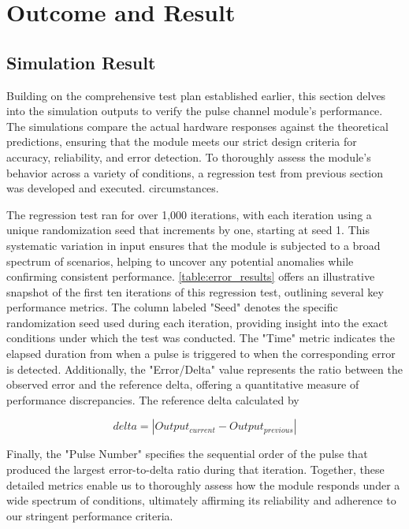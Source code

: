 \chapter{Outcome and Result}

\section{Simulation Result}

Building on the comprehensive test plan established earlier, this section delves into the simulation outputs to verify the pulse channel module's performance. The simulations compare the actual hardware responses against the theoretical predictions, ensuring that the module meets our strict design criteria for accuracy, reliability, and error detection. To thoroughly assess the module's behavior across a variety of conditions, a regression test from previous section was developed and executed. circumstances.

The regression test ran for over 1,000 iterations, with each iteration using a unique randomization seed that increments by one, starting at seed 1. This systematic variation in input ensures that the module is subjected to a broad spectrum of scenarios, helping to uncover any potential anomalies while confirming consistent performance. \autoref{table:error_results} offers an illustrative snapshot of the first ten iterations of this regression test, outlining several key performance metrics. The column labeled "Seed" denotes the specific randomization seed used during each iteration, providing insight into the exact conditions under which the test was conducted. The "Time" metric indicates the elapsed duration from when a pulse is triggered to when the corresponding error is detected. Additionally, the "Error/Delta" value represents the ratio between the observed error and the reference delta, offering a quantitative measure of performance discrepancies. The reference delta calculated by

\begin{equation}
delta = |Output_{current} - Output_{previous}|
\end{equation}

Finally, the "Pulse Number" specifies the sequential order of the pulse that produced the largest error-to-delta ratio during that iteration. Together, these detailed metrics enable us to thoroughly assess how the module responds under a wide spectrum of conditions, ultimately affirming its reliability and adherence to our stringent performance criteria.

